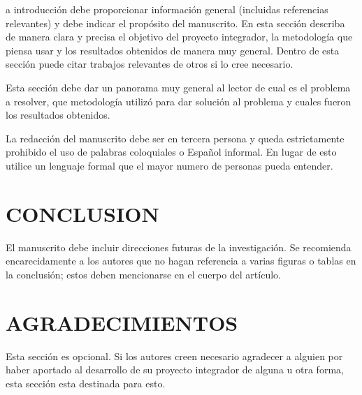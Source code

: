 \documentclass{IEEEcsmag}
\begin{document}
\maketitle
{}a introducción debe proporcionar información general (incluidas referencias relevantes) y debe indicar el propósito del manuscrito. En esta sección describa de manera clara y precisa el objetivo del proyecto integrador, la metodología que piensa usar y los resultados obtenidos de manera muy general. Dentro de esta sección puede citar trabajos relevantes de otros si lo cree necesario.

Esta sección debe dar un panorama muy general al lector de cual es el problema a resolver, que metodología utilizó para dar solución al problema y cuales fueron los resultados obtenidos. 

La redacción del manuscrito debe ser en tercera persona y queda estrictamente prohibido el uso de palabras coloquiales o Español informal. En lugar de esto utilice un lenguaje formal que el mayor numero de personas pueda entender.
\clearpage


\clearpage


\clearpage


\clearpage


\clearpage


\clearpage


\clearpage


\section{CONCLUSION}
El manuscrito debe incluir direcciones futuras de la investigación. Se recomienda encarecidamente a los autores que no hagan referencia a varias figuras o tablas en la conclusión; estos deben mencionarse en el cuerpo del artículo.
\vspace*{-8pt}


\section{AGRADECIMIENTOS}
Esta sección es opcional. Si los autores creen necesario agradecer a alguien por haber aportado al desarrollo de su proyecto integrador de alguna u otra forma, esta sección esta destinada para esto.


\def\refname{REFERENCES}
\end{document}
